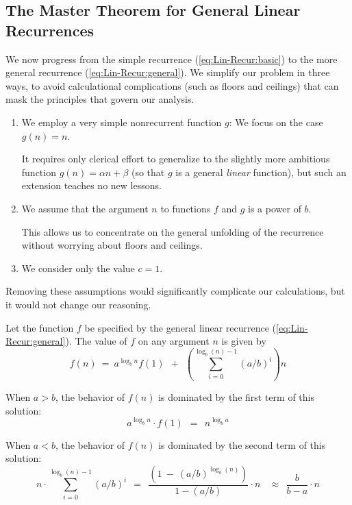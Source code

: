 \subsection{The Master Theorem for General Linear Recurrences} 
\label{sec:linear-recurrence-general}

We now progress from the simple recurrence (\ref{eq:Lin-Recur:basic}) to the more general recurrence (\ref{eq:Lin-Recur:general}).  We simplify our problem in three ways, to avoid calculational complications (such as floors and ceilings) that can mask the principles that govern
our analysis.
\begin{enumerate}
\item
We employ a very simple nonrecurrent function $g$: We focus on the case $g(n) = n$.

\smallskip

It requires only clerical effort to generalize to the slightly more ambitious function $g(n) = \alpha n + \beta$ (so that $g$ is a general {\em linear} function), but such an extension teaches no new lessons.
\item
We assume that the argument $n$ to functions $f$ and $g$ is a power of $b$.

\smallskip

This allows us to concentrate on the general unfolding of the recurrence without worrying about floors and ceilings.

\item
We consider only the value $c=1$.
\end{enumerate}
Removing these assumptions would significantly complicate our calculations, but it would not change our reasoning.

\begin{theorem}
\label{thm:master-thm-genl}
Let the function $f$ be specified by the general linear recurrence (\ref{eq:Lin-Recur:general}). The value of $f$ on any argument $n$ is given by
\[
f(n) \ = \ 
a^{\log_b n} f(1) \ \ + \ \ \left( \sum_{i=0}^{\log_b (n)-1} (a/b)^i \right) n
\]

\smallskip

\noindent
When $a > b$, the behavior of $f(n)$ is dominated by the first term of this solution:
\[ a^{\log_b n} \cdot  f(1) \ \ = \ \ n^{\log_b a} \]

\smallskip

\noindent
When $a < b$, the behavior of $f(n)$ is dominated by the second term of this solution:
\[
n \cdot \sum_{i=0}^{\log_b (n)-1} (a/b)^i
  \ \ = \ \
\frac{\left( 1 \ - \  (a/b)^{\log_b (n)} \right)}{1- (a/b)} \cdot n \ \
  \ \ \approx \ \
\frac{b}{b - a} \cdot n
\]
\end{theorem}

